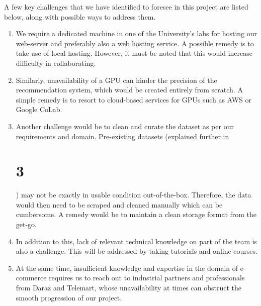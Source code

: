 A few key challenges that we have identified to foresee in this project are listed below, along with possible ways to address them.

\begin{enumerate}
	\item We require a dedicated machine in one of the University’s labs for hosting our web-server and preferably also a web hosting service. A possible remedy is to take use of local hosting. However, it must be noted that this would increase difficulty in collaborating.
	\item Similarly, unavailability of a GPU can hinder the precision of the recommendation system, which would be created entirely from scratch. A simple remedy is to resort to cloud-based services for GPUs such as AWS or Google CoLab.
	\item Another challenge would be to clean and curate the dataset as per our requirements and domain. Pre-existing datasets (explained further in \chapter{3}) may not be exactly in usable condition out-of-the-box. Therefore, the data would then need to be scraped and cleaned manually which can be cumbersome. A remedy would be to maintain a clean storage format from the get-go.
	\item In addition to this, lack of relevant technical knowledge on part of the team is also a challenge. This will be addressed by taking tutorials and online courses.
	\item At the same time, insufficient knowledge and expertise in the domain of e-commerce requires us to reach out to industrial partners and professionals from Daraz and Telemart, whose unavailability at times can obstruct the smooth progression of our project.
\end{enumerate}
